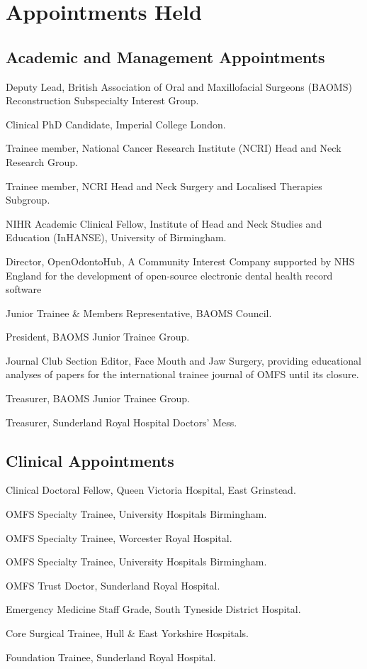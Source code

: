 \section*{Appointments Held}

\subsection*{Academic and Management Appointments}

 Deputy Lead, British Association of Oral and Maxillofacial Surgeons (BAOMS) Reconstruction Subspecialty Interest Group.

 Clinical PhD Candidate, Imperial College London.

 Trainee member, National Cancer Research Institute (NCRI) Head and Neck Research Group.

 Trainee member, NCRI Head and Neck Surgery and Localised Therapies Subgroup.

 NIHR Academic Clinical Fellow, Institute of Head and Neck Studies and Education (InHANSE), University of Birmingham.

 Director, OpenOdontoHub, A Community Interest Company supported by NHS England for the development of open-source electronic dental health record software

 Junior Trainee \& Members Representative, BAOMS Council.

 President, BAOMS Junior Trainee Group.

 Journal Club Section Editor, Face Mouth and Jaw Surgery, providing educational analyses of papers for the international trainee journal of OMFS until its closure.

 Treasurer, BAOMS Junior Trainee Group.

 Treasurer, Sunderland Royal Hospital Doctors' Mess.



\subsection*{Clinical Appointments}

 Clinical Doctoral Fellow, Queen Victoria Hospital, East Grinstead.

 OMFS Specialty Trainee, University Hospitals Birmingham.

 OMFS Specialty Trainee, Worcester Royal Hospital.

 OMFS Specialty Trainee, University Hospitals Birmingham.

 OMFS Trust Doctor, Sunderland Royal Hospital.

 Emergency Medicine Staff Grade, South Tyneside District Hospital.

 Core Surgical Trainee, Hull \& East Yorkshire Hospitals.

 Foundation Trainee, Sunderland Royal Hospital.

